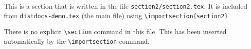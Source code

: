 This is a section that is written in the file
\texttt{section2/section2.tex}.
It is included from \texttt{distdocs-demo.tex} (the main file) using
\texttt{\textbackslash importsection\{section2\}}.

There is no explicit \texttt{\textbackslash section} command in this file.
This has been inserted automatically by the \texttt{\textbackslash importsection}
command.

